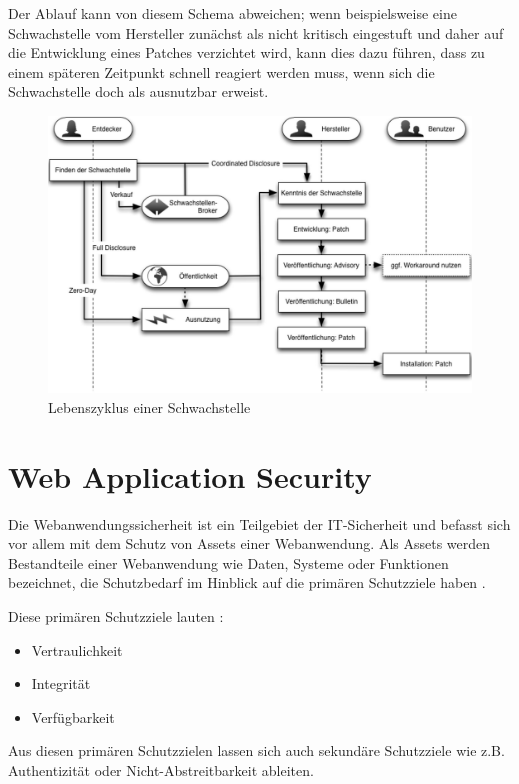 \documentclass[12pt,oneside,a4paper,parskip,pointlessnumbers]{scrbook}
\begin{document}
  Der Ablauf kann von diesem Schema abweichen; wenn beispielsweise eine Schwachstelle vom Hersteller zunächst als nicht kritisch eingestuft und daher auf die Entwicklung eines Patches verzichtet wird, kann dies dazu führen, dass zu einem späteren Zeitpunkt schnell reagiert werden muss, wenn sich die Schwachstelle doch als ausnutzbar erweist. \cite{BSI3}
\vspace{20pt}
  \begin{figure}[H]
    \centering
     \includegraphics[width=1\textwidth]{Images/Lebenszyklus}
    \caption[Lebenszyklus einer Schwachstelle]{Lebenszyklus einer Schwachstelle \cite[S.2]{BSI3}}
  \end{figure}



  \section{Web Application Security}
  Die Webanwendungssicherheit ist ein Teilgebiet der IT-Sicherheit und befasst sich vor allem mit dem Schutz von Assets einer Webanwendung. Als Assets werden Bestandteile einer Webanwendung wie Daten, Systeme oder Funktionen bezeichnet, die Schutzbedarf im Hinblick auf die primären Schutzziele haben \cite{BSI}.

  Diese primären Schutzziele lauten \cite{BSI}:
    \begin{itemize}
    \item Vertraulichkeit
    \item Integrität
    \item Verfügbarkeit
  \end{itemize}

  Aus diesen primären Schutzzielen lassen sich auch sekundäre Schutzziele wie z.B. Authentizität oder Nicht-Abstreitbarkeit ableiten.
\end{document}

